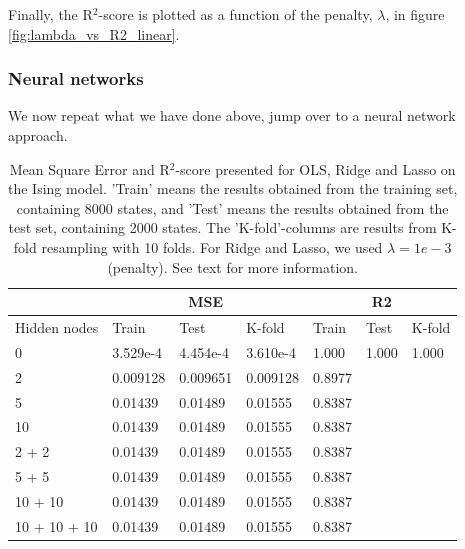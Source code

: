 Finally, the R$^2$-score is plotted as a function of the penalty, $\lambda$, in figure \eqref{fig:lambda_vs_R2_linear}.

\subsubsection{Neural networks}
We now repeat what we have done above, jump over to a neural network approach. 
\begin{table} [H]
	\caption{Mean Square Error and R$^2$-score presented for OLS, Ridge and Lasso on the Ising model. 'Train' means the results obtained from the training set, containing 8000 states, and 'Test' means the results obtained from the test set, containing 2000 states. The 'K-fold'-columns are results from K-fold resampling with 10 folds. For Ridge and Lasso, we used $\lambda=1e-3$ (penalty). See text for more information.}
	\begin{tabularx}{\textwidth}{l|XXX|XXX} \hline\hline
		\label{tab:nn}
		& \multicolumn{3}{c}{\textbf{MSE}}&\multicolumn{3}{c}{\textbf{R2}}\\ \hline
		Hidden nodes&Train&Test&K-fold&Train&Test&K-fold\\ \hline
		0 & 3.529e-4 & 4.454e-4 & 3.610e-4 & 1.000 & 1.000 & 1.000\\
		2 & 0.009128 & 0.009651 & 0.009128 & 0.8977 \\
		5 & 0.01439 & 0.01489 & 0.01555 & 0.8387 \\
		10 & 0.01439 & 0.01489 & 0.01555 & 0.8387 \\
		2 + 2 & 0.01439 & 0.01489 & 0.01555 & 0.8387 \\
		5 + 5 & 0.01439 & 0.01489 & 0.01555 & 0.8387 \\ 
		10 + 10 & 0.01439 & 0.01489 & 0.01555 & 0.8387 \\
		10 + 10 + 10 & 0.01439 & 0.01489 & 0.01555 & 0.8387 \\ \hline\hline
	\end{tabularx}
\end{table}

